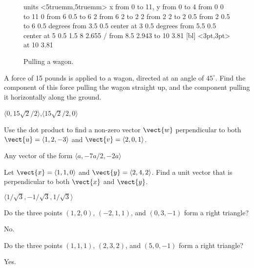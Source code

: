 \begin{enumialphparenastyle}
\begin{ex}
\begin{figure}[H]
\centerline{
\vbox{\beginpicture
\normalgraphs
\setcoordinatesystem units <5truemm,5truemm>
\setplotarea x from 0 to 11, y from 0 to 4
\putrule from 0 0 to 11 0
\putrule from 6 0.5 to 6 2
\putrule from 6 2 to 2 2
\putrule from 2 2 to 2 0.5
\putrule from 2 0.5 to 6 0.5
 degrees from 3.5 0.5 center at 3 0.5
 degrees from 5.5 0.5 center at 5 0.5
 1.5 8 2.655 /
\arrow <4pt> [0.35, 1] from 8.5 2.943 to 10 3.81
 [bl] <3pt,3pt> at 10 3.81
\endpicture}}
\caption{Pulling a wagon. \label{fig:pulling a wagon}}
\end{figure}
\end{ex}

\begin{ex}
A force of 15 pounds is applied to a wagon, directed at an
angle of $45^\circ$. Find the component of this force pulling the
wagon straight up, and the component pulling it horizontally along
the ground.
\begin{sol}
	$\langle 0,15\sqrt2/2\rangle$,$\langle 15\sqrt2/2,0\rangle$
\end{sol}
\end{ex}

\begin{ex}
Use the dot product to find a non-zero vector $\vect{w}$
perpendicular to both $\vect{u}=\langle 1,2,-3\rangle$ and 
$\vect{v}=\langle 2,0,1\rangle$.
\begin{sol}
	Any vector of the form $\langle a, -7a/2, -2a\rangle$
\end{sol}
\end{ex}

\begin{ex}
Let $\vect{x}=\langle 1,1,0 \rangle$ and $\vect{y}=\langle
2,4,2 \rangle$.  Find a unit vector that is perpendicular to both $\vect{x}$ and $\vect{y}$.
\begin{sol}
	$\langle 1/\sqrt3,-1/\sqrt3,1/\sqrt3\rangle$
\end{sol}
\end{ex}

\begin{ex}
Do the three points $(1,2,0)$, $(-2,1,1)$, and $(0,3,-1)$
form a right triangle?
\begin{sol}
	No.
\end{sol}
\end{ex}

\begin{ex}
Do the three points $(1,1,1)$, $(2,3,2)$, and $(5,0,-1)$
form a right triangle?
\begin{sol}
	Yes.
\end{sol}
\end{ex}


\end{enumialphparenastyle}
